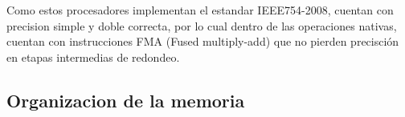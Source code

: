 Como estos procesadores implementan el estandar IEEE754-2008, cuentan con precision simple y
doble correcta, por lo cual dentro de las operaciones nativas, cuentan con instrucciones FMA
(Fused multiply-add) que no pierden precisci\'on en etapas intermedias de redondeo.






\subsection{Organizacion de la memoria}

